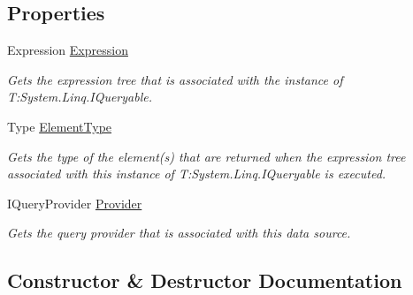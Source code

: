 \subsection*{Properties}
\begin{DoxyCompactItemize}
\item 
Expression \hyperlink{classCqrs_1_1Sql_1_1DataStores_1_1SqlDataStore_a821c821912482862e0b6143a3125e2e1_a821c821912482862e0b6143a3125e2e1}{Expression}
\begin{DoxyCompactList}\small\item\em Gets the expression tree that is associated with the instance of T\+:\+System.\+Linq.\+I\+Queryable. \end{DoxyCompactList}\item 
Type \hyperlink{classCqrs_1_1Sql_1_1DataStores_1_1SqlDataStore_a60de9af52248c2d71e2bb010e51b5c06_a60de9af52248c2d71e2bb010e51b5c06}{Element\+Type}
\begin{DoxyCompactList}\small\item\em Gets the type of the element(s) that are returned when the expression tree associated with this instance of T\+:\+System.\+Linq.\+I\+Queryable is executed. \end{DoxyCompactList}\item 
I\+Query\+Provider \hyperlink{classCqrs_1_1Sql_1_1DataStores_1_1SqlDataStore_af732efd5901590c769e2ace2a4f4f913_af732efd5901590c769e2ace2a4f4f913}{Provider}
\begin{DoxyCompactList}\small\item\em Gets the query provider that is associated with this data source. \end{DoxyCompactList}\end{DoxyCompactItemize}


\subsection{Constructor \& Destructor Documentation}
\mbox{\label{classCqrs_1_1Sql_1_1DataStores_1_1SqlDataStore_a3ddc911126acbde0353e7773ddfa8acc_a3ddc911126acbde0353e7773ddfa8acc}} 
